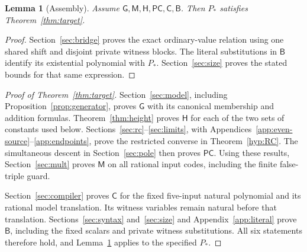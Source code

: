 \documentclass[11pt]{article}
\newtheorem{lemma}[theorem]{Lemma}
\theoremstyle{definition}
\theoremstyle{remark}
\begin{document}
\begin{lemma}[Assembly]\label{lem:assembly}
Assume $\mathsf G,\mathsf M,\mathsf H,\mathsf{PC},\mathsf C,\mathsf B$.
Then $P_*$ satisfies Theorem~\ref{thm:target}.
\end{lemma}
\begin{proof}
Section~\ref{sec:bridge} proves the exact ordinary-value relation using
one shared shift and disjoint private witness blocks. The literal
substitutions in $\mathsf B$ identify its existential polynomial with
$P_*$. Section~\ref{sec:size} proves the stated bounds for that same
expression.
\end{proof}

\begin{proof}[Proof of Theorem~\ref{thm:target}]
Section~\ref{sec:model}, including Proposition~\ref{prop:generator},
proves $\mathsf G$ with its canonical membership and addition formulas.
Theorem~\ref{thm:height} proves $\mathsf H$ for each of the two sets of
constants used below. Sections~\ref{sec:rc}--\ref{sec:limits}, with
Appendices~\ref{app:even-source}--\ref{app:endpoints}, prove the restricted
converse in Theorem~\ref{hyp:RC}. The simultaneous descent in
Section~\ref{sec:pole} then proves $\mathsf{PC}$. Using these results,
Section~\ref{sec:mult} proves $\mathsf M$ on all rational input codes,
including the finite false-triple guard.

Section~\ref{sec:compiler} proves $\mathsf C$ for the fixed five-input
natural polynomial and its rational model translation. Its witness
variables remain natural before that translation. Sections~\ref{sec:syntax}
and~\ref{sec:size} and Appendix~\ref{app:literal} prove $\mathsf B$, including
the fixed scalars and private witness substitutions. All six statements
therefore hold, and Lemma~\ref{lem:assembly} applies to the specified $P_*$.
\end{proof}
\end{document}
